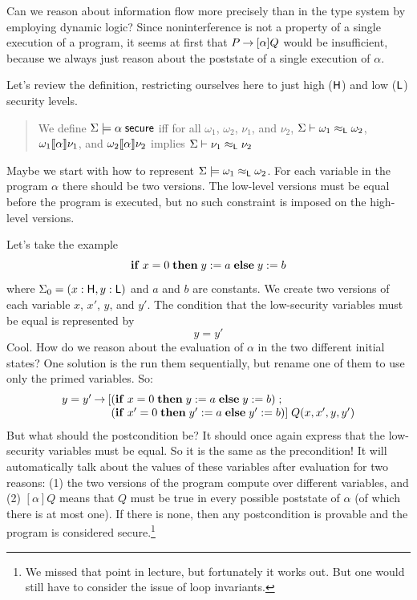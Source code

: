\documentclass[11pt]{article}
\begin{document}
Can we reason about information flow more precisely than in the type system by
employing dynamic logic?  Since noninterference is not a property of a single
execution of a program, it seems at first that $P \mathbin{\rightarrow} [\alpha]Q$ would be
insufficient, because we always just reason about the poststate of a single
execution of $\alpha$.

Let's review the definition, restricting ourselves here to just high ($\mathsf{H}$)
and low ($\mathsf{L}$) security levels.
\begin{quote}
  We define $\Sigma \models \alpha\; \mathsf{secure}$ \newline iff for all
  $\omega_1$, $\omega_2$, $\nu_1$, and $\nu_2$, \newline
  $\Sigma \vdash \omega_1 \approx_{\mathsf{L}} \omega_2$,
  $\omega_1 \llbracket \alpha \rrbracket \nu_1$, and $\omega_2 \llbracket \alpha \rrbracket \nu_2$
  implies $\Sigma \vdash \nu_1 \approx_{\mathsf{L}} \nu_2$
\end{quote}

Maybe we start with how to represent $\Sigma \models \omega_1 \approx_{\mathsf{L}} \omega_2$.
For each variable in the program $\alpha$ there should be two versions.
The low-level versions must be equal before the program is executed,
but no such constraint is imposed on the high-level versions.

Let's take the example
\[
  \mathbf{if}\; x = 0\; \mathbf{then}\; y := a\; \mathbf{else}\; y := b
\]
where $\Sigma_0 = (x : \mathsf{H}, y : \mathsf{L})$ and $a$ and $b$ are constants.  We
create two versions of each variable $x$, $x'$, $y$, and $y'$.
The condition that the low-security variables must be equal is
represented by
\[
  y = y'
\]
Cool.  How do we reason about the evaluation of $\alpha$ in the
two different initial states?  One solution is the run them sequentially,
but rename one of them to use only the primed variables.  So:
\[
  \begin{array}{l@{}l}
    y = y' \arrow [ & (\mb{if}\; x = 0\; \mb{then}\; y := a\; \mb{else}\; y := b)\semi \\
    &   (\mb{if}\; x' = 0\; \mb{then}\; y' := a\; \mb{else}\; y' := b)]\; Q(x,x',y,y')
  \end{array}
\]
But what should the postcondition be?  It should once again express that the
low-security variables must be equal.  So it is the same as the precondition!
It will automatically talk about the values of these variables after evaluation
for two reasons: (1) the two versions of the program compute over different
variables, and (2) $[\alpha]Q$ means that $Q$ must be true in every possible
poststate of $\alpha$ (of which there is at most one).  If there is none, then
any postcondition is provable and the program is considered secure.\footnote{We
  missed that point in lecture, but fortunately it works out.  But one would
  still have to consider the issue of loop invariants.}
\end{document}
